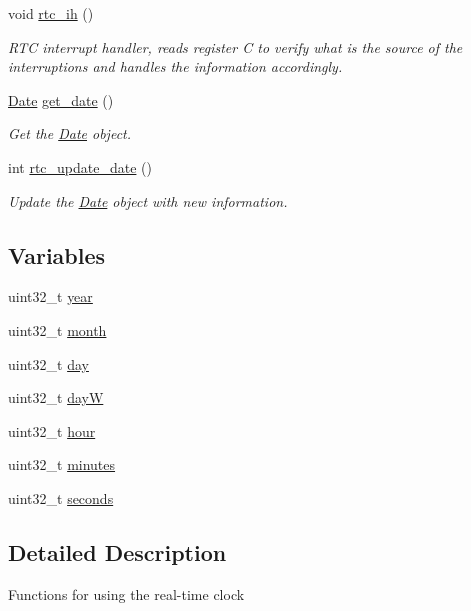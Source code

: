 \begin{DoxyCompactItemize}
void \mbox{\hyperlink{group__rtc_ga75dad42881d64cf07cf1bdc2979a7056}{rtc\+\_\+ih}} ()
\begin{DoxyCompactList}\small\item\em R\+TC interrupt handler, reads register C to verify what is the source of the interruptions and handles the information accordingly. \end{DoxyCompactList}\item 
\mbox{\hyperlink{struct_date}{Date}} \mbox{\hyperlink{group__rtc_ga1f2c4f317d879fe00426ee4317bc625f}{get\+\_\+date}} ()
\begin{DoxyCompactList}\small\item\em Get the \mbox{\hyperlink{struct_date}{Date}} object. \end{DoxyCompactList}\item 
int \mbox{\hyperlink{group__rtc_ga1c7900b102529826ac1662355e6cf058}{rtc\+\_\+update\+\_\+date}} ()
\begin{DoxyCompactList}\small\item\em Update the \mbox{\hyperlink{struct_date}{Date}} object with new information. \end{DoxyCompactList}\end{DoxyCompactItemize}
\subsection*{Variables}
\begin{DoxyCompactItemize}
\item 
uint32\+\_\+t \mbox{\hyperlink{group__rtc_gaac3a162d2f192fe2360aba534eac7198}{year}}
\item 
uint32\+\_\+t \mbox{\hyperlink{group__rtc_ga55a5fa57878363d803833666ddf3c16f}{month}}
\item 
uint32\+\_\+t \mbox{\hyperlink{group__rtc_ga897ed87b95b7a37afeeb935ca0b2366b}{day}}
\item 
uint32\+\_\+t \mbox{\hyperlink{group__rtc_gaa24f12f79f7553236083be08521c546e}{dayW}}
\item 
uint32\+\_\+t \mbox{\hyperlink{group__rtc_ga26d5bae76d83086900174b266fd2cd82}{hour}}
\item 
uint32\+\_\+t \mbox{\hyperlink{group__rtc_ga2dcb690348d97b756f4d165c80c9af7d}{minutes}}
\item 
uint32\+\_\+t \mbox{\hyperlink{group__rtc_ga6d5694839ec935781627e5c52de21fda}{seconds}}
\end{DoxyCompactItemize}


\subsection{Detailed Description}
Functions for using the real-\/time clock 

